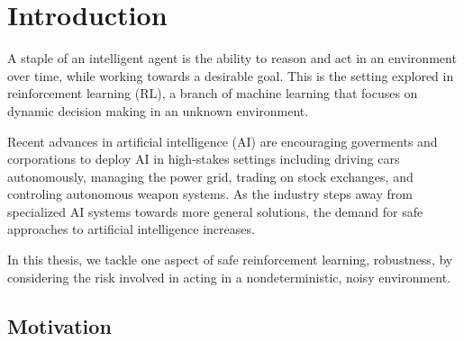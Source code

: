 \chapter{Introduction}\label{ch:intro}
%

A staple of an intelligent agent is the ability to reason and act in an environment over time, while working towards a desirable goal. This is the setting explored in reinforcement learning (RL), a branch of machine learning that focuses on dynamic decision making in an unknown environment.

Recent advances in artificial intelligence (AI) are encouraging goverments and corporations to deploy AI in high-stakes settings including driving cars autonomously, managing the power grid, trading on stock exchanges, and controling autonomous weapon systems. As the industry steps away from specialized AI systems towards more general solutions, the demand for safe approaches to artificial intelligence increases.

In this thesis, we tackle one aspect of safe reinforcement learning, robustness, by considering the risk involved in acting in a nondeterministic, noisy environment.

\section{Motivation}\label{sec:intro:motivation}

